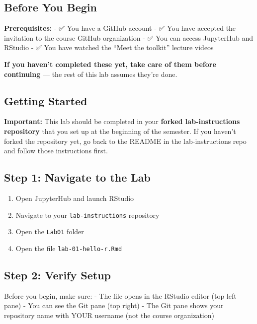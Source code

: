 \documentclass[]{tufte-handout}
\providecommand{\tightlist}{%
  \setlength{\itemsep}{0pt}\setlength{\parskip}{0pt}}
\begin{document}
\subsection{Before You Begin}\label{before-you-begin}

\textbf{Prerequisites:} - ✅ You have a GitHub account - ✅ You have
accepted the invitation to the course GitHub organization - ✅ You can
access JupyterHub and RStudio - ✅ You have watched the ``Meet the
toolkit'' lecture videos

\textbf{If you haven't completed these yet, take care of them before
continuing} --- the rest of this lab assumes they're done.

\subsection{Getting Started}\label{getting-started}

\textbf{Important:} This lab should be completed in your \textbf{forked
lab-instructions repository} that you set up at the beginning of the
semester. If you haven't forked the repository yet, go back to the
README in the lab-instructions repo and follow those instructions first.

\subsection{Step 1: Navigate to the
Lab}\label{step-1-navigate-to-the-lab}

\begin{enumerate}
\def\labelenumi{\arabic{enumi}.}
\tightlist
\item
  Open JupyterHub and launch RStudio
\item
  Navigate to your \texttt{lab-instructions} repository
\item
  Open the \texttt{Lab01} folder
\item
  Open the file \texttt{lab-01-hello-r.Rmd}
\end{enumerate}

\subsection{Step 2: Verify Setup}\label{step-2-verify-setup}

Before you begin, make sure: - The file opens in the RStudio editor (top
left pane) - You can see the Git pane (top right) - The Git pane shows
your repository name with YOUR username (not the course organization)
\end{document}

